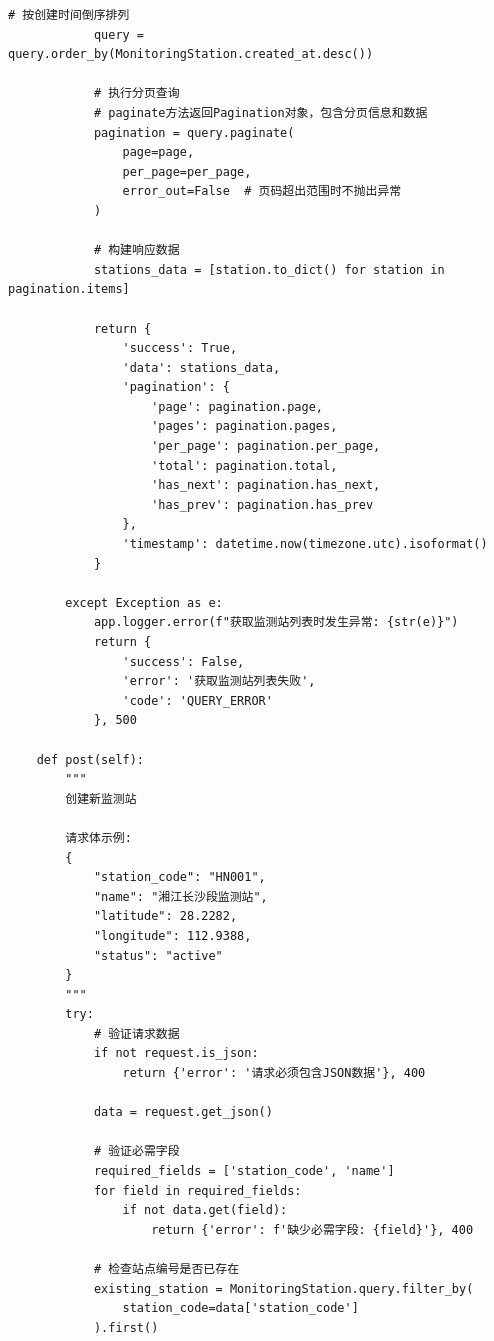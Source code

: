 \begin{lstlisting}[style=python]
            # 按创建时间倒序排列
            query = query.order_by(MonitoringStation.created_at.desc())
            
            # 执行分页查询
            # paginate方法返回Pagination对象，包含分页信息和数据
            pagination = query.paginate(
                page=page,
                per_page=per_page,
                error_out=False  # 页码超出范围时不抛出异常
            )
            
            # 构建响应数据
            stations_data = [station.to_dict() for station in pagination.items]
            
            return {
                'success': True,
                'data': stations_data,
                'pagination': {
                    'page': pagination.page,
                    'pages': pagination.pages,
                    'per_page': pagination.per_page,
                    'total': pagination.total,
                    'has_next': pagination.has_next,
                    'has_prev': pagination.has_prev
                },
                'timestamp': datetime.now(timezone.utc).isoformat()
            }
            
        except Exception as e:
            app.logger.error(f"获取监测站列表时发生异常: {str(e)}")
            return {
                'success': False,
                'error': '获取监测站列表失败',
                'code': 'QUERY_ERROR'
            }, 500
    
    def post(self):
        """
        创建新监测站
        
        请求体示例:
        {
            "station_code": "HN001",
            "name": "湘江长沙段监测站",
            "latitude": 28.2282,
            "longitude": 112.9388,
            "status": "active"
        }
        """
        try:
            # 验证请求数据
            if not request.is_json:
                return {'error': '请求必须包含JSON数据'}, 400
            
            data = request.get_json()
            
            # 验证必需字段
            required_fields = ['station_code', 'name']
            for field in required_fields:
                if not data.get(field):
                    return {'error': f'缺少必需字段: {field}'}, 400
            
            # 检查站点编号是否已存在
            existing_station = MonitoringStation.query.filter_by(
                station_code=data['station_code']
            ).first()
            

\end{lstlisting}
